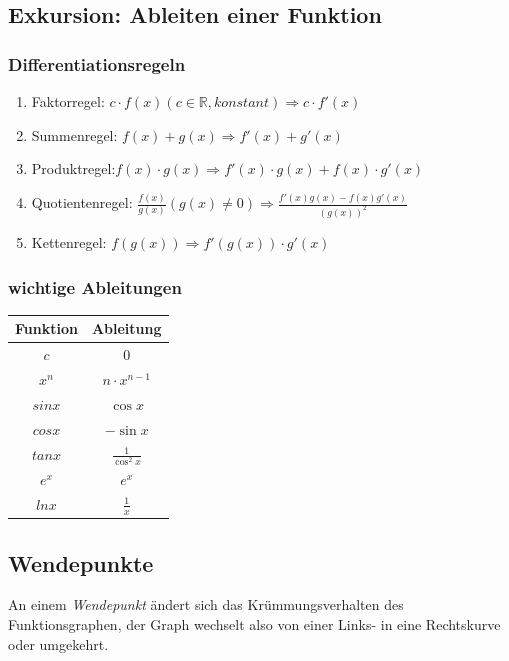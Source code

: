 \subsection{Exkursion: Ableiten einer Funktion} 
\subsubsection{Differentiationsregeln}
\begin{enumerate}
\item Faktorregel: $c\cdot f(x)(c \in \mathbb{R},konstant) \Rightarrow c\cdot f'(x)$
\item Summenregel: $f(x) + g(x) \Rightarrow f'(x)+g'(x)$
\item Produktregel:$f(x)\cdot g(x) \Rightarrow f'(x)\cdot g(x) + f(x)\cdot g'(x)$
\item Quotientenregel: $\displaystyle \frac{f(x)}{g(x)} (g(x)\neq 0) \Rightarrow \displaystyle \frac{f'(x)g(x) - f(x)g'(x)}{(g(x))^2}$
\item Kettenregel: $f(g(x)) \Rightarrow f'(g(x))\cdot g'(x)$
\end{enumerate}

\subsubsection{wichtige Ableitungen}
\begin{center}
\begin{tabular}{c|c}
Funktion & Ableitung\\
\hline
$c$ & $0$\\
$x^n$ & $n\cdot x^{n-1}$\\
$sin x$ & $\cos x$\\
$cos x$ &$-\sin x$\\
$tan x $& $\displaystyle \frac{1}{\cos^2 x}$\\
$e^x$ & $e^x$\\
$ln x$ & $\frac{1}{x}$\\
\end{tabular}
\end{center}
\subsection{Wendepunkte}

An einem \emph{Wendepunkt} ändert sich das Krümmungsverhalten des Funktionsgraphen, der Graph wechselt also von einer Links- in eine Rechtskurve oder umgekehrt.

